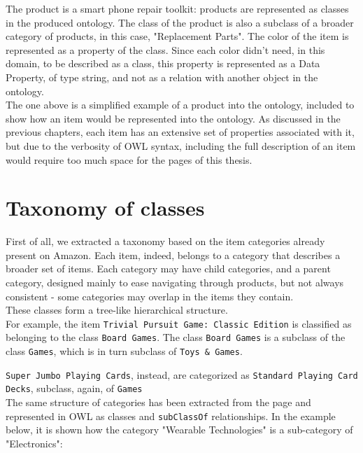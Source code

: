 \documentclass[LaM,binding=0.6cm]{sapthesis}
\begin{document}
\bigskip

The product is a smart phone repair toolkit: products are represented as classes in the produced ontology. The class of the product is also a subclass of a broader category of products, in this case, "Replacement Parts". 
The color of the item is represented as a property of the class. Since each color didn't need, in this domain, to be described as a class, this property is represented as a Data Property, of type string, and not as a relation with another object in the ontology.\\

The one above is a simplified example of a product into the ontology, included to show how an item would be represented into the ontology. As discussed in the previous chapters, each item has an extensive set of properties associated with it, but due to the verbosity of OWL syntax, including the full description of an item would require too much space for the pages of this thesis.

\section{Taxonomy of classes}

First of all, we extracted a taxonomy based on the item categories already present on Amazon. Each item, indeed, belongs to a category that describes a broader set of items. Each category may have child categories, and a parent category, designed mainly to ease navigating through products, but not always consistent - some categories may overlap in the items they contain.\\

These classes form a tree-like hierarchical structure. \\

For example, the item \texttt{Trivial Pursuit Game: Classic Edition} is classified as belonging to the class \texttt{Board Games}. The class \texttt{Board Games} is a subclass of the class \texttt{Games}, which is in turn subclass of \texttt{Toys \& Games}.

\texttt{Super Jumbo Playing Cards}, instead, are categorized as \texttt{Standard Playing Card Decks}, subclass, again, of \texttt{Games} \\

The same structure of categories has been extracted from the page and represented in OWL as classes and \texttt{subClassOf} relationships. In the example below, it is shown how the category "Wearable Technologies" is a sub-category of "Electronics":
\end{document}

